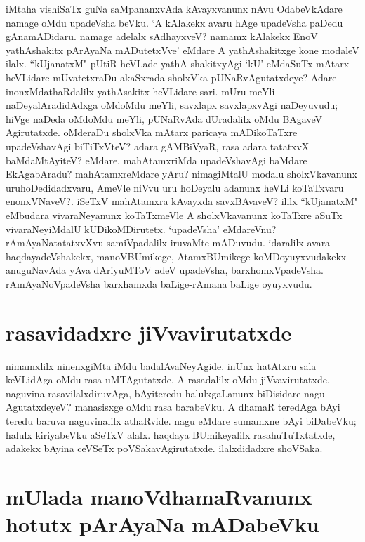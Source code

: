 iMtaha vishiSaTx guNa saMpananxvAda kAvayxvanunx nAvu OdabeVkAdare namage oMdu upadeVsha beVku. `A kAlakekx avaru hAge upadeVsha paDedu gAnamADidaru. namage adelalx sAdhayxveV? namamx kAlakekx EnoV yathAshakitx pArAyaNa mADutetxVve' eMdare A yathAshakitxge kone modaleV ilalx. ``kUjanatxM" pUtiR heVLade yathA shakitxyAgi `kU' eMdaSuTx mAtarx heVLidare mUvatetxraDu akaSxrada sholxVka pUNaRvAgutatxdeye? Adare inonxMdathaRdalilx yathAsakitx heVLidare sari. mUru meYli naDeyalAradidAdxga oMdoMdu meYli, savxlapx savxlapxvAgi naDeyuvudu; hiVge naDeda oMdoMdu meYli, pUNaRvAda dUradalilx oMdu BAgaveV Agirutatxde. oMderaDu sholxVka mAtarx paricaya mADikoTaTxre upadeVshavAgi biTiTxVteV? adara gAMBiVyaR, rasa adara tatatxvX baMdaMtAyiteV? eMdare, mahAtamxriMda upadeVshavAgi baMdare EkAgabAradu? mahAtamxreMdare yAru? nimagiMtalU modalu sholxVkavanunx uruhoDedidadxvaru, AmeVle niVvu uru hoDeyalu adanunx heVLi koTaTxvaru enonxVNaveV?. iSeTxV mahAtamxra kAvayxda savxBAvaveV? ililx ``kUjanatxM" eMbudara vivaraNeyanunx koTaTxmeVle A sholxVkavanunx koTaTxre aSuTx vivaraNeyiMdalU kUDikoMDirutetx. `upadeVsha' eMdareVnu? rAmAyaNatatatxvXvu samiVpadalilx iruvaMte mADuvudu. idaralilx avara haqdayadeVshakekx, manoVBUmikege, AtamxBUmikege koMDoyuyxvudakekx anuguNavAda yAva dAriyuMToV adeV upadeVsha, barxhomxVpadeVsha. rAmAyaNoVpadeVsha barxhamxda baLige-rAmana baLige oyuyxvudu. 
\section*{rasavidadxre jiVvavirutatxde} 

nimamxlilx ninenxgiMta iMdu badalAvaNeyAgide. inUnx hatAtxru sala keVLidAga oMdu rasa uMTAgutatxde. A rasadalilx oMdu jiVvavirutatxde. naguvina rasavilalxdiruvAga, bAyiteredu halulxgaLanunx biDisidare nagu AgutatxdeyeV? manasisxge oMdu rasa barabeVku. A dhamaR teredAga bAyi teredu baruva naguvinalilx athaRvide. nagu eMdare sumamxne bAyi biDabeVku; halulx kiriyabeVku aSeTxV alalx. haqdaya BUmikeyalilx rasahuTuTxtatxde, adakekx bAyina ceVSeTx poVSakavAgirutatxde. ilalxdidadxre shoVSaka. 

\section*{mUlada manoVdhamaRvanunx hotutx pArAyaNa mADabeVku} 

